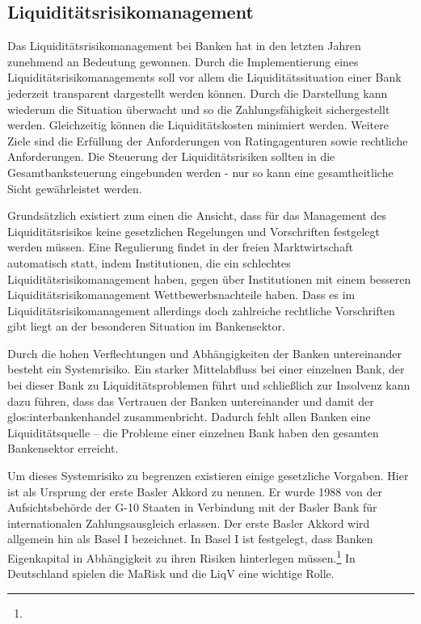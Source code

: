 \begin{onehalfspacing}
\section{Liquiditätsrisikomanagement}
Das Liquiditätsrisikomanagement bei Banken hat in den letzten Jahren zunehmend an Bedeutung gewonnen. Durch die Implementierung eines Liquiditätsrisikomanagements  soll vor allem die Liquiditätssituation einer Bank jederzeit transparent dargestellt werden können. Durch die Darstellung kann wiederum die Situation überwacht und so die Zahlungsfähigkeit sichergestellt werden. Gleichzeitig können die Liquiditätskosten minimiert werden. Weitere Ziele sind die Erfüllung der Anforderungen von Ratingagenturen sowie rechtliche Anforderungen. Die Steuerung der Liquiditätsrisiken sollten in die Gesamtbanksteuerung eingebunden werden - nur so kann eine gesamtheitliche Sicht gewährleistet werden.

Grundsätzlich existiert zum einen die Ansicht, dass für das Management des Liquiditätsrisikos keine gesetzlichen Regelungen und Vorschriften festgelegt werden müssen. Eine Regulierung findet in der freien Marktwirtschaft automatisch statt, indem Institutionen, die ein schlechtes Liquiditätsrisikomanagement haben, gegen über Institutionen mit einem besseren Liquiditätsrisikomanagement Wettbewerbsnachteile haben. Dass es im Liquiditätsrisikomanagement allerdings doch zahlreiche rechtliche Vorschriften gibt liegt an der besonderen Situation im Bankensektor.

Durch die hohen Verflechtungen und Abhängigkeiten der Banken untereinander besteht ein Systemrisiko. Ein starker Mittelabfluss bei einer einzelnen Bank, der bei dieser Bank zu Liquiditätsproblemen führt und schließlich zur Insolvenz kann dazu führen, dass das Vertrauen der Banken untereinander und damit der \gls{glos:interbankenhandel} zusammenbricht. Dadurch fehlt allen Banken eine Liquiditätsquelle -- die Probleme einer einzelnen Bank haben den gesamten Bankensektor erreicht.

Um dieses Systemrisiko zu begrenzen existieren einige gesetzliche Vorgaben. Hier ist als Ursprung der erste Basler Akkord zu nennen. Er wurde 1988 von der Aufsichtsbehörde der G-10 Staaten in Verbindung mit der Basler Bank für internationalen Zahlungsausgleich erlassen. Der erste Basler Akkord wird allgemein hin als Basel I bezeichnet. In Basel I ist festgelegt, dass Banken Eigenkapital in Abhängigkeit zu ihren Risiken hinterlegen müssen.\footnote{ } In Deutschland spielen die \gls{MaRisk} und die \gls{LiqV} eine wichtige Rolle.


\end{onehalfspacing}

